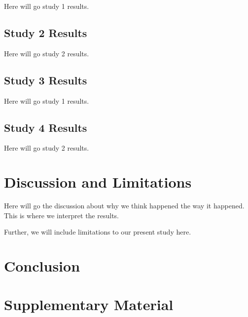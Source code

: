 \documentclass{article}
\begin{document}
Here will go study 1 results.

\subsection{Study 2 Results}

Here will go study 2 results.

\subsection{Study 3 Results}

Here will go study 1 results.

\subsection{Study 4 Results}

Here will go study 2 results.

\section{Discussion and Limitations} 

Here will go the discussion about why we think happened the way it happened. This is where we interpret the results. 

Further, we will include limitations to our present study here.



\section{Conclusion}

\newpage




\newpage

\appendix

\section{Supplementary Material}
\end{document}
